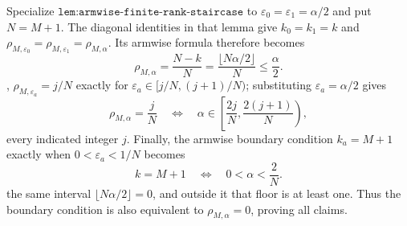 Specialize \(\texttt{lem:armwise-finite-rank-staircase}\) to \(\varepsilon_0=\varepsilon_1=\alpha/2\) and put \(N=M+1\). The diagonal identities in that lemma give \(k_0=k_1=k\) and \(\rho_{M,\varepsilon_0}=\rho_{M,\varepsilon_1}=\rho_{M,\alpha}\). Its armwise formula therefore becomes\n\[\rho_{M,\alpha}=\frac{N-k}{N}=\frac{\lfloor N\alpha/2\rfloor}{N}\le\frac{\alpha}{2}.\]\nLikewise, \(\rho_{M,\varepsilon_a}=j/N\) exactly for \(\varepsilon_a\in[j/N,(j+1)/N)\); substituting \(\varepsilon_a=\alpha/2\) gives\n\[\rho_{M,\alpha}=\frac jN\quad\Longleftrightarrow\quad\alpha\in\left[\frac{2j}{N},\frac{2(j+1)}{N}\right),\]\nfor every indicated integer \(j\). Finally, the armwise boundary condition \(k_a=M+1\) exactly when \(0<\varepsilon_a<1/N\) becomes\n\[k=M+1\quad\Longleftrightarrow\quad0<\alpha<\frac2N.\]\nOn the same interval \(\lfloor N\alpha/2\rfloor=0\), and outside it that floor is at least one. Thus the boundary condition is also equivalent to \(\rho_{M,\alpha}=0\), proving all claims.